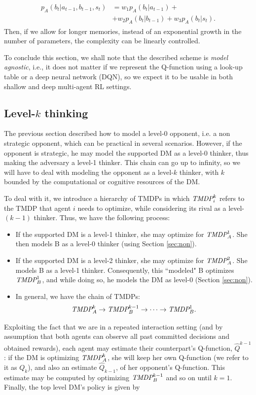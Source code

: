 \documentclass[letterpaper]{article} %
\begin{document}
\begin{align*}
\begin{split}
p_{A}(b_t | a_{t-1}, b_{t-1}, s_t) &= w_1 p_{A}(b_t | a_{t-1})  +\\ &+ w_2 p_{A}(b_t | b_{t-1})
 + w_3 p_{A}(b_t | s_t).
 \end{split}
\end{align*}
Then, if we allow for longer memories, instead of an exponential growth in the number of parameters, the complexity can be linearly controlled.

To conclude this section, we shall note that the described scheme is \emph{model agnostic}, i.e., it does not matter if we represent the Q-function using a look-up table or a deep neural network (DQN), so we expect it to be usable in both shallow and deep multi-agent RL settings.

\subsection{Level-$k$ thinking}\label{sec:k}


The previous section described how to model a level-0 opponent, i.e. a non strategic opponent, which can be practical in several scenarios. However, if the opponent is strategic, he may model the supported DM as a level-0 thinker, thus making the adversary a level-1 thinker. This chain can go up to infinity, so we will have to deal with modeling the opponent as a level-$k$ thinker, with $k$ bounded by the computational or cognitive resources of the DM.

To deal with it, we introduce a hierarchy of TMDPs in which
 $\emph{TMDP}_{i}^k$ refers to the TMDP that agent $i$ needs to optimize,
 while considering its rival as a level-$(k-1)$ thinker.
Thus, we have the following process:

\begin{itemize}
\item If the supported DM is a level-1 thinker, she may optimize for $ \emph{TMDP}_{A}^1 $. She then models B as a level-0 thinker (using Section \ref{sec:non}).
\item If the supported DM is a level-2 thinker, she may optimize for $ \emph{TMDP}_{A}^2 $. She models B as a level-1 thinker. Consequently, this ``modeled" B optimizes $ \emph{TMDP}_{B}^1 $, and while doing so, he models the DM as level-0 (Section \ref{sec:non}).
\item In general, we have the chain of TMDPs: $$ \emph{TMDP}_{A}^k \rightarrow \emph{TMDP}_{B}^{k-1} \rightarrow \cdots \rightarrow \emph{TMDP}_{B}^{1}.$$
\end{itemize}
Exploiting the fact that we are in a repeated interaction setting (and by assumption that both agents can observe all past committed decisions and obtained rewards), each agent may  estimate their counterpart's Q-function, $\hat{Q}^{k-1}$:
if the DM is optimizing $\emph{TMDP}_A^k$, she will keep her own Q-function (we refer to it as $Q_k$), and also an estimate $\hat{Q}_{k-1}$, of her opponent's Q-function. This estimate may be computed by optimizing $\emph{TMDP}_B^{k-1}$ and so on until $k=1$.
Finally, the top level DM's policy is given by
\end{document}
